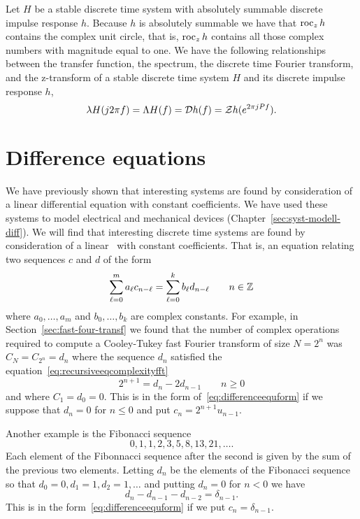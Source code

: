 Let $H$ be a stable discrete time system with absolutely summable discrete impulse response $h$.  Because $h$ is absolutely summable we have that $\operatorname{roc}_z h$ contains the complex unit circle, that is, $\operatorname{roc}_z h$ contains all those complex numbers with magnitude equal to one.  We have the following relationships between the transfer function, the spectrum, the discrete time Fourier transform, and the z-transform of a stable discrete time system $H$ and its discrete impulse response $h$,
\[
\lambda H(j2\pi f) = \Lambda H(f) = {\mathcal D} h(f) = {\mathcal Z} h(e^{2\pi j P f}).
\]

\section{Difference equations}\label{sec:difference-equations}

\nocite{SolimanAndSrinath_1990}

We have previously shown that interesting systems are found by consideration of a linear differential equation with constant coefficients.  We have used these systems to model electrical and mechanical devices (Chapter~\ref{sec:syst-modell-diff}).  We will find that interesting discrete time systems are found by consideration of a linear~ with constant coefficients.  That is, an equation relating two sequences $c$ and $d$ of the form
\begin{equation}\label{eq:differenceequform}
\sum_{\ell=0}^{m} a_\ell c_{n - \ell} = \sum_{\ell=0}^{k} b_\ell d_{n - \ell} \qquad n \in {\mathbb Z}
\end{equation}
where $a_0,\dots,a_m$ and $b_0,\dots,b_k$ are complex constants.  For example, in Section~\ref{sec:fast-four-transf} we found that the number of complex operations required to compute a Cooley-Tukey fast Fourier transform of size $N = 2^n$ was $C_N = C_{2^n} = d_n$ where the sequence $d_n$ satisfied the equation~\eqref{eq:recursiveeqcomplexityfft}
\[
2^{n+1} = d_n - 2 d_{n-1} \qquad n \geq 0
\]
and where $C_1 = d_0 = 0$.  This is in the form of~\eqref{eq:differenceequform} if we suppose that $d_n = 0$ for $n \leq 0$ and put $c_n = 2^{n+1} u_{n-1}$.

Another example is the Fibonacci sequence
\[
0,1,1,2,3,5,8,13,21,\dots.
\]
Each element of the Fibonnacci sequence after the second is given by the sum of the previous two elements.  Letting $d_n$ be the elements of the Fibonacci sequence so that $d_0 = 0, d_1 = 1, d_2 = 1, \dots$ and putting $d_n = 0$ for $n < 0$ we have
\[
d_{n} - d_{n-1} - d_{n-2} = \delta_{n-1}.
\] 
This is in the form~\eqref{eq:differenceequform} if we put $c_n = \delta_{n-1}$.

